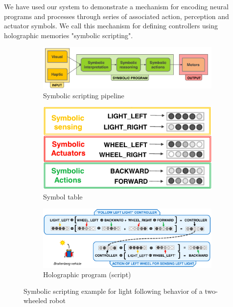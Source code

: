 \documentclass[conference]{IEEEtran}
\begin{document}
We have used our system to demonstrate a mechanism for encoding neural programs and processes through series of associated action, perception and actuator symbols. We call this mechanism for defining controllers using holographic memories "symbolic scripting".


\begin{figure}[th!]
	\center
	\begin{subfigure}{1\columnwidth}
		\includegraphics[width=\columnwidth]{img/control_pipeline.png}
		\caption{Symbolic scripting pipeline}
		\label{fig:symbolic-scripting-a}
	\end{subfigure}
	
	
	\begin{subfigure}{0.7\columnwidth}
		\center
		\includegraphics[width=\columnwidth]{img/symbol_table.png}
		\caption{Symbol table}
		\label{fig:symbolic-scripting-b}
	\end{subfigure}
	\begin{subfigure}{1\columnwidth}
		\includegraphics[width=\columnwidth]{img/controller.png}
		\caption{Holographic program (script)}
		\label{fig:symbolic-scripting-c}
	\end{subfigure}
	\caption{Symbolic scripting example for light following behavior of a two-wheeled robot}
	\label{fig:symbolic-scripting}
\end{figure}
\end{document}

